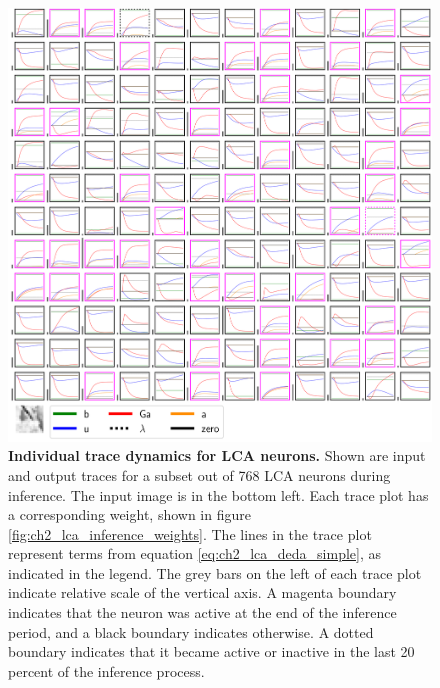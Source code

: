 \begin{figure}[h]
    \centering
    \includegraphics[width=\textwidth]{figures/lca_inference_traces.png}
    \caption{\textbf{Individual trace dynamics for LCA neurons.} Shown are input and output traces for a subset out of 768 LCA neurons during inference. The input image is in the bottom left. Each trace plot has a corresponding weight, shown in figure \ref{fig:ch2_lca_inference_weights}.  The lines in the trace plot represent terms from equation \eqref{eq:ch2_lca_deda_simple}, as indicated in the legend. The grey bars on the left of each trace plot indicate relative scale of the vertical axis. A magenta boundary indicates that the neuron was active at the end of the inference period, and a black boundary indicates otherwise. A dotted boundary indicates that it became active or inactive in the last 20 percent of the inference process.}
    \label{fig:ch2_lca_inference_traces}
\end{figure}